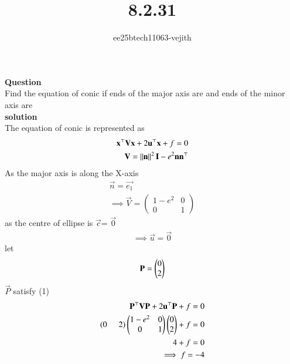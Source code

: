 \documentclass[journal]{IEEEtran}
\begin{document}

\vspace{3cm}

\title{8.2.31}
\author{ee25btech11063-vejith}

\maketitle
{\let\newpage\relax\maketitle}
\renewcommand{\thefigure}{\theenumi}
\renewcommand{\thetable}{\theenumi}
\setlength{\intextsep}{10pt} %
\textbf{Question}\\
Find the equation of conic if ends of the major axis are  and ends of the minor axis are  \\
\textbf{solution}\\
The equation of conic is represented as
\begin{align}
\mathbf{x}^\top\mathbf{V}\mathbf{x} + 2\mathbf{u}^\top\mathbf{x} + f = 0\\
\mathbf{V}=\left\lVert\mathbf{n}\right\rVert^2\mathbf{I}-e^2\mathbf{n}\mathbf{n}^\top
\end{align}
As the major axis is along the X-axis 
\begin{align}
    \vec{n}=\vec{e_1}\\
    \implies \vec{V}=\begin{pmatrix}
        1-e^2 & 0\\
        0 & 1
    \end{pmatrix}
\end{align}
as the centre of ellipse is $\vec{c}$= $\vec{0}$
\begin{align}
    \implies \vec{u}=\vec{0}
\end{align}
let
\begin{align}
    \mathbf{P}=\begin{pmatrix}0\\2\end{pmatrix}
\end{align}
$\vec{P}$  satisfy (1)
\begin{align}
    \mathbf{P}^\top\mathbf{V}\mathbf{P} + 2\mathbf{u}^\top\mathbf{P} + f = 0\\
    \left(0\hspace{0.5cm} 2\right) \begin{pmatrix}
        1-e^2 & 0\\
        0 & 1
    \end{pmatrix}\begin{pmatrix}0\\2\end{pmatrix} +f=0\\
     4+f=0 \\
     \implies f=-4
\end{align}
\end{document}
